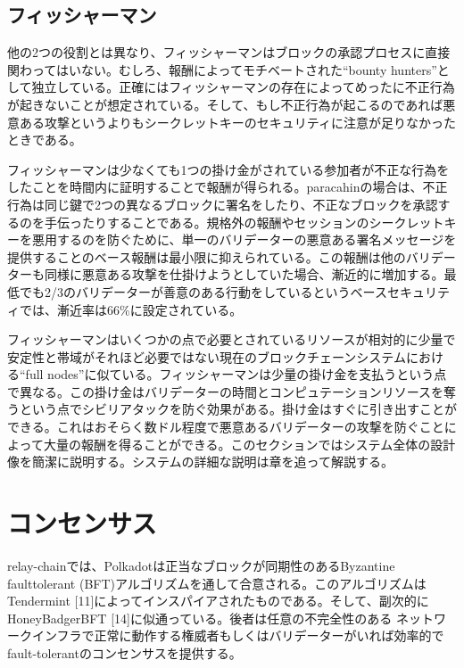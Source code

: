 \hypertarget{ux30d5ux30a3ux30c3ux30b7ux30e3ux30fcux30deux30f3}{%
\subsection{フィッシャーマン}\label{ux30d5ux30a3ux30c3ux30b7ux30e3ux30fcux30deux30f3}}

他の2つの役割とは異なり、フィッシャーマンはブロックの承認プロセスに直接関わってはいない。むしろ、報酬によってモチベートされた``bounty
hunters''として独立している。正確にはフィッシャーマンの存在によってめったに不正行為が起きないことが想定されている。そして、もし不正行為が起こるのであれば悪意ある攻撃というよりもシークレットキーのセキュリティに注意が足りなかったときである。

フィッシャーマンは少なくても1つの掛け金がされている参加者が不正な行為をしたことを時間内に証明することで報酬が得られる。paracahinの場合は、不正行為は同じ鍵で2つの異なるブロックに署名をしたり、不正なブロックを承認するのを手伝ったりすることである。規格外の報酬やセッションのシークレットキーを悪用するのを防ぐために、単一のバリデーターの悪意ある署名メッセージを提供することのベース報酬は最小限に抑えられている。この報酬は他のバリデーターも同様に悪意ある攻撃を仕掛けようとしていた場合、漸近的に増加する。最低でも2/3のバリデーターが善意のある行動をしているというベースセキュリティでは、漸近率は66\%に設定されている。

フィッシャーマンはいくつかの点で必要とされているリソースが相対的に少量で安定性と帯域がそれほど必要ではない現在のブロックチェーンシステムにおける``full
nodes''に似ている。フィッシャーマンは少量の掛け金を支払うという点で異なる。この掛け金はバリデーターの時間とコンピュテーションリソースを奪うという点でシビリアタックを防ぐ効果がある。掛け金はすぐに引き出すことができる。これはおそらく数ドル程度で悪意あるバリデーターの攻撃を防ぐことによって大量の報酬を得ることができる。このセクションではシステム全体の設計像を簡潔に説明する。システムの詳細な説明は章を追って解説する。

\hypertarget{ux30b3ux30f3ux30bbux30f3ux30b5ux30b9}{%
\section{コンセンサス}\label{ux30b3ux30f3ux30bbux30f3ux30b5ux30b9}}

relay-chainでは、Polkadotは正当なブロックが同期性のあるByzantine
faulttolerant
(BFT)アルゴリズムを通して合意される。このアルゴリズムはTendermint
{[}11{]}によってインスパイアされたものである。そして、副次的にHoneyBadgerBFT
{[}14{]}に似通っている。後者は任意の不完全性のある
ネットワークインフラで正常に動作する権威者もしくはバリデーターがいれば効率的でfault-tolerantのコンセンサスを提供する。

